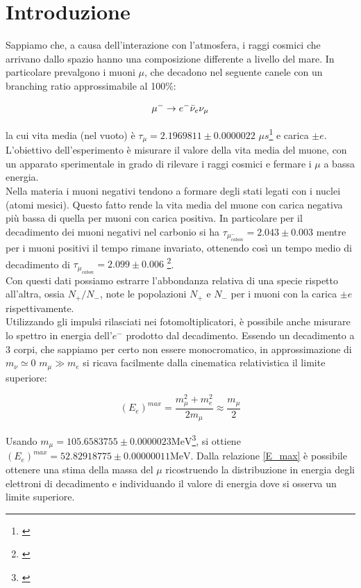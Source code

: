 \documentclass[10pt,a4paper]{article}
\begin{document}
\newpage

\section{Introduzione}\label{sec:intro}

\begin{flushleft}
Sappiamo che, a causa dell'interazione con l'atmosfera, i raggi cosmici che arrivano dallo spazio hanno una composizione differente a livello del mare. In particolare prevalgono i muoni $\mu$, che decadono nel seguente canele con un branching ratio approssimabile al 100$\%$:

\begin{equation}\label{mu_decay}
    \ce{$\mu^{-}\rightarrow e^{-}\bar \nu_e \nu_{\mu}$}
\end{equation}

la cui vita media (nel vuoto) è $\tau_{\mu} = 2.1969811 \pm 0.0000022 $ $\mu s$\footnote{\cite{PDG2024MuonListing}} e carica $\pm e$.\\
L'obiettivo dell'esperimento è misurare il valore della vita media del muone, con un apparato sperimentale in grado di rilevare i raggi cosmici e fermare i $\mu$ a bassa energia. \\
Nella materia i muoni negativi tendono a formare degli stati legati con i nuclei (atomi mesici). Questo fatto rende la vita media del muone con carica negativa più bassa di quella per muoni con carica positiva. In particolare per il decadimento dei muoni negativi nel carbonio si ha $\tau_{\mu^-_{cabon}}=2.043 \pm 0.003$ mentre per i muoni positivi il tempo rimane invariato, ottenendo così un tempo medio di decadimento di  $\tau_{\mu_{cabon}}=2.099 \pm 0.006$ \footnote{\cite{GasparikSivertzNSRL2023}}.\\
Con questi dati possiamo estrarre l'abbondanza relativa di una specie rispetto all'altra, ossia $N_+/N_-$, note le popolazioni $N_+$ e $N_-$ per i muoni con la carica $\pm e$ rispettivamente.\\
Utilizzando gli impulsi rilasciati nei fotomoltiplicatori, è possibile anche misurare lo spettro in energia dell'$e^{-}$ prodotto dal decadimento. Essendo un decadimento a 3 corpi, che sappiamo per certo non essere monocromatico, in approssimazione di $m_{\nu} \simeq 0 $ $ m_\mu \gg m_e $ si ricava facilmente dalla cinematica relativistica il limite superiore:

\begin{equation}\label{E_max}
    (E_e)^{max} = \frac{m_{\mu}^2+m_{e}^2}{2m_{\mu}} \approx \frac{m_\mu}{2}
\end{equation}



Usando $m_\mu = 105.6583755 \pm 0.0000023\text{MeV}$\footnote{\cite{PDG2024MuonListing}}, si ottiene  $(E_e)^{max} =52.82918775 \pm 0.00000011 \text{MeV}$. 
Dalla relazione \ref{E_max} è possibile ottenere una stima della massa del $\mu$ ricostruendo la distribuzione in energia degli elettroni di decadimento e individuando il valore di energia dove si osserva un limite superiore.

\end{flushleft}
\newpage
\end{document}
